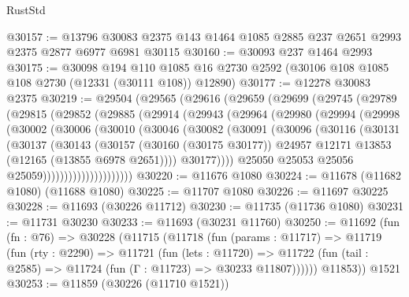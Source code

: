 \begin{lexlean}{RustStd}
\begin{coremodule}
@30157 := @13796 @30083 @2375 @143 @1464 @1085 @2885 @237 @2651 @2993 @2375 @2877 @6977 @6981 @30115
@30160 := @30093 @237 @1464 @2993
@30175 := @30098
    @194
    @110
    @1085
    @16
    @2730
    @2592
    (@30106 @108 @1085 @108 @2730 (@12331 (@30111 @108)) @12890)
@30177 := @12278 @30083 @2375
@30219 := @29504
    (@29565
      (@29616
        (@29659
          (@29699
            (@29745
              (@29789
                (@29815
                  (@29852
                    (@29885
                      (@29914
                        (@29943
                          (@29964
                            (@29980
                              (@29994
                                (@29998
                                  (@30002
                                    (@30006
                                      (@30010
                                        (@30046
                                          (@30082
                                            (@30091
                                              (@30096
                                                (@30116
                                                  (@30131
                                                    (@30137
                                                      (@30143
                                                        (@30157
                                                          (@30160 (@30175 @30177))
                                                          @24957
                                                          @12171
                                                          @13853
                                                          (@12165 (@13855 @6978 @2651))))
                                                      @30177))))
                                              @25050
                                              @25053
                                              @25056
                                              @25059)))))))))))))))))))))
@30220 := @11676 @1080
@30224 := @11678 (@11682 @1080) (@11688 @1080)
@30225 := @11707 @1080
@30226 := @11697 @30225
@30228 := @11693 (@30226 @11712)
@30230 := @11735 (@11736 @1080)
@30231 := @11731 @30230
@30233 := @11693 (@30231 @11760)
@30250 := @11692
    (fun (fn : @76) =>
    @30228
      (@11715
        (@11718
          (fun (params : @11717) =>
          @11719
            (fun (rty : @2290) =>
            @11721
              (fun (lets : @11720) =>
              @11722 (fun (tail : @2585) => @11724 (fun (Γ : @11723) => @30233 @11807))))))
        @11853))
    @1521
@30253 := @11859 (@30226 (@11710 @1521))

\end{coremodule}
\end{lexlean}

